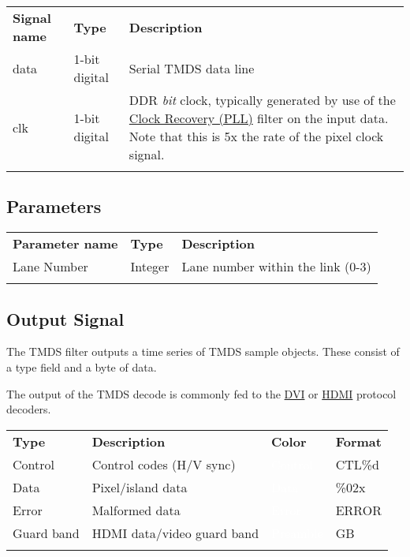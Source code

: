 \begin{tabularx}{16cm}{llX}
\thickhline
\textbf{Signal name} & \textbf{Type} & \textbf{Description} \\
\thickhline
data & 1-bit digital & Serial TMDS data line \\
\thinhline
clk & 1-bit digital & DDR \emph{bit} clock, typically generated by use of the \hyperref[filter:cdrpll]{Clock Recovery
(PLL)} filter on the input data. Note that this is 5x the rate of the pixel clock signal. \\
\thickhline
\end{tabularx}

\subsection{Parameters}

\begin{tabularx}{16cm}{llX}
\thickhline
\textbf{Parameter name} & \textbf{Type} & \textbf{Description} \\
\thinhline
Lane Number & Integer & Lane number within the link (0-3)\\
\thickhline
\end{tabularx}

\subsection{Output Signal}

The TMDS filter outputs a time series of TMDS sample objects. These consist of a type field and a byte of data.

The output of the TMDS decode is commonly fed to the \hyperref[filter:dvi]{DVI} or \hyperref[filter:hdmi]{HDMI}
protocol decoders.

\begin{tabularx}{16cm}{lllX}
\thickhline
\textbf{Type} & \textbf{Description} & \textbf{Color} & \textbf{Format} \\
\thickhline
Control & Control codes (H/V sync) & \cellcolor{control}\textcolor{white}{Control} & CTL\%d \\
\thinhline
Data & Pixel/island data & \cellcolor{data}\textcolor{white}{Data} & \%02x \\
\thinhline
Error & Malformed data & \cellcolor{error}\textcolor{white}{Error} & ERROR \\
\thinhline
Guard band & HDMI data/video guard band & \cellcolor{preamble}\textcolor{white}{Preamble} & GB \\
\thickhline
\end{tabularx}

